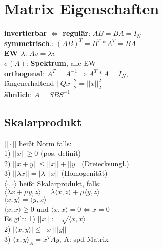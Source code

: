 \section{Matrix Eigenschaften}
\textbf{invertierbar} $\Leftrightarrow$ \textbf{regulär}: $AB = BA = I_{N}$\\
\textbf{symmetrisch}.: $(AB)^{T} = B^{T}*A^{T} = BA$\\
\textbf{EW $\lambda$}: $Av = \lambda v$\\ 
$\sigma(A)$: \textbf{Spektrum}, alle EW\\
\textbf{orthogonal}: $A^T = A^{-1} \Rightarrow A^T * A = I_N$,\\
längenerhaltend $||Qx||_2^2 = ||x||_2^2$\\
\textbf{ähnlich}: $A = SBS^{-1}$
\subsection*{Skalarprodukt}
$||\cdot||$ heißt Norm falls: \\
1) $||x|| \geq 0$ (pos. definit)\\
2) $||x + y|| \leq ||x|| + ||y||$ (Dreiecksungl.)\\
3) $||\lambda x|| = |\lambda| ||x||$ (Homogenität)\\

$\langle \cdot , \cdot \rangle$ heißt Skalarprodukt, falls:\\
$\langle \lambda x + \mu y , z \rangle = \lambda\langle x , z \rangle + \mu\langle y , z \rangle$\\
$\langle x , y \rangle = \langle y , x \rangle$\\
$\langle x , x \rangle \geq 0 $ und $\langle x , x \rangle = 0 \Leftrightarrow x = 0$\\
Es gilt: 1) $||x|| := \sqrt{\langle x , x \rangle}$\\
2) $|\langle x , y \rangle| \leq ||x|| ||y||$\\
3) $\langle x , y \rangle_{A} = x^{T}Ay$, A: spd-Matrix
